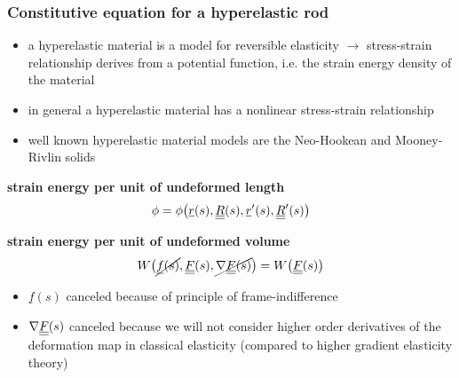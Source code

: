\begin{frame}
  \frametitle{Constitutive equation for a hyperelastic rod}

  \begin{itemize}
    \item a hyperelastic material is a model for reversible elasticity $\rightarrow$ stress-strain relationship derives from a potential function, i.e. the strain energy density of the material
    \item in general a hyperelastic material has a nonlinear stress-strain relationship
    \item well known hyperelastic material models are the Neo-Hookean and Mooney-Rivlin solids
  \end{itemize}
  
  \vspace{1.5em}
  \textbf{strain energy per unit of undeformed length}
  \begin{displaymath}
    \phi = \phi \bigl( \underline{r}(s),\underline{\underline{R}}(s),\underline{r}^{\prime}(s),\underline{\underline{R}}^{\prime}(s) \bigr)
  \end{displaymath}
  
  \vspace{1.5em}
  \textbf{strain energy per unit of undeformed volume}
  \begin{displaymath}
    W \bigl( \cancel{\underline{f}(s)}, \underline{\underline{F}}(s), \cancel{\nabla \underline{\underline{F}}(s)} \bigr) = W \bigl( \underline{\underline{F}}(s) \bigr)
  \end{displaymath}

  \vspace{0.1em}
  \begin{itemize}
    \item $\underline{f}(s)$ canceled because of principle of frame-indifference
    \item $\nabla \underline{\underline{F}}(s)$ canceled because we will not consider higher order derivatives of the deformation map in classical elasticity (compared to higher gradient elasticity theory)
  \end{itemize}
\end{frame}


